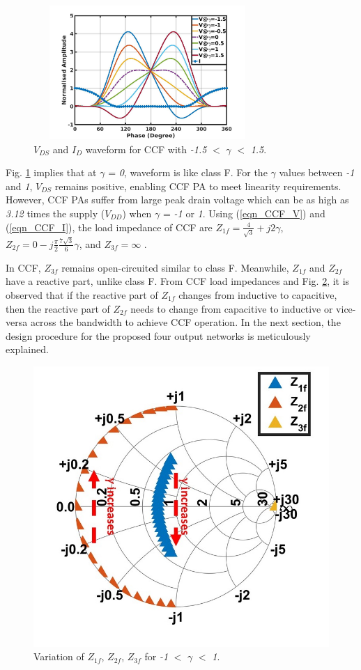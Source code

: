 \documentclass[conference]{IEEEtran}
\begin{document}
\begin{figure}[!t]
\centering
\captionsetup{font=footnotesize}
\includegraphics[width=3.4in, height=2in]{Images/CCF/CCF_wave_VI.jpg}
\caption{$V_{DS}$ and $I_D$ waveform for CCF with \textit{-1.5} $<$ $\gamma$ $<$ \textit{1.5}.}
\label{fig:CCF_wave_VI}
\vspace{-0.1in}
\end{figure}

Fig. \ref{fig:CCF_wave_VI} implies that at $\gamma$ = \textit{0}, waveform is like class F. For the $\gamma$ values between \textit{-1} and \textit{1}, $V_{DS}$ remains positive, enabling CCF PA to meet linearity requirements. However, CCF PAs suffer from large peak drain voltage which can be as high as \textit{3.12} times the supply ($V_{DD}$) when $\gamma$ = \textit{-1} or \textit{1}. Using (\ref{eqn_CCF_V}) and (\ref{eqn_CCF_I}), the load impedance of CCF  are $Z_{1f}=\frac{4}{\sqrt{3}}+j 2 \gamma$, $Z_{2f}=0-j \frac{\pi}{2} \frac{7 \sqrt{3}}{6} \gamma$, and $Z_{3f}=\infty$ \cite{CCFDesign_ali}.


In CCF, $Z_{3f}$ remains open-circuited similar to class F. Meanwhile, $Z_{1f}$ and $Z_{2f}$ have a reactive part, unlike class F. From CCF load impedances and Fig. \ref{fig:CCF_SC}, it is observed that if the reactive part of $Z_{1f}$ changes from inductive to capacitive, then the reactive part of $Z_{2f}$  needs to change from capacitive to inductive or vice-versa across the bandwidth to achieve CCF operation. In the next section, the design procedure for the proposed four output networks is meticulously explained. 

\begin{figure}[!t]
\centering
\captionsetup{font=footnotesize}
\includegraphics[width=0.63\linewidth]{Images/CCF/CCF_SC.jpg}
\caption{Variation of $Z_{1f}$, $Z_{2f}$, $Z_{3f}$ for \textit{-1} $<$ $\gamma$ $<$ \textit{1}.}
\label{fig:CCF_SC}
\vspace{-0.25in}
\end{figure}
 
\end{document}
